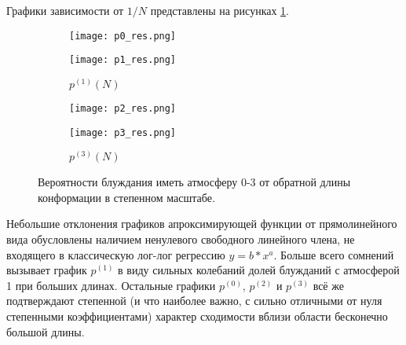 Графики зависимости от $1/N$ представлены на рисунках \ref{fig:p_03_loglog}.

\begin{figure}[h]
\centering
\begin{subfigure}{0.495\textwidth}
\texttt{[image: p0\_res.png]}
\caption{$p^{(0)}(N)$}
\texttt{[image: p1\_res.png]}
\caption{$p^{(1)}(N)$}
\end{subfigure}
\hfill
\begin{subfigure}{0.495\textwidth}
\centering
\texttt{[image: p2\_res.png]}
\caption{$p^{(2)}(N)$}
\texttt{[image: p3\_res.png]}
\caption{$p^{(3)}(N)$}
\end{subfigure}
\caption{Вероятности блуждания иметь атмосферу 0-3 от обратной длины конформации в степенном масштабе.}
\label{fig:p_03_loglog}
\end{figure}

Небольшие отклонения графиков апроксимирующей функции от прямолинейного вида обусловлены наличием ненулевого свободного линейного члена,
не входящего в классическую лог-лог регрессию $y = b * x^a$.
Больше всего сомнений вызывает график $p^{(1)}$ в виду сильных колебаний долей блужданий с атмосферой 1 при больших длинах.
Остальные графики $p^{(0)}$, $p^{(2)}$ и $p^{(3)}$ всё же подтверждают степенной (и что наиболее важно, с сильно отличными от нуля степенными коэффициентами) характер сходимости вблизи области бесконечно большой длины.